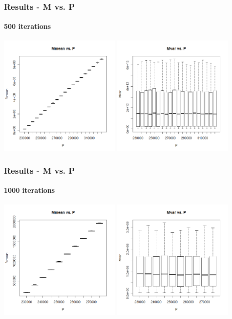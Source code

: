 \begin{frame}
    \frametitle{Results - M vs. P }
	\framesubtitle{500 iterations}
\hspace*{-5mm}
\includegraphics[height=6cm]{boxplot500_mmean_P}
\includegraphics[height=6cm]{boxplot500_mvar_P}
\end{frame}


\begin{frame}
    \frametitle{Results - M vs. P }
	\framesubtitle{1000 iterations}
\hspace*{-5mm}
\includegraphics[height=6cm]{boxplot1000_mmean_P}
\includegraphics[height=6cm]{boxplot1000_mvar_P}
\end{frame}





